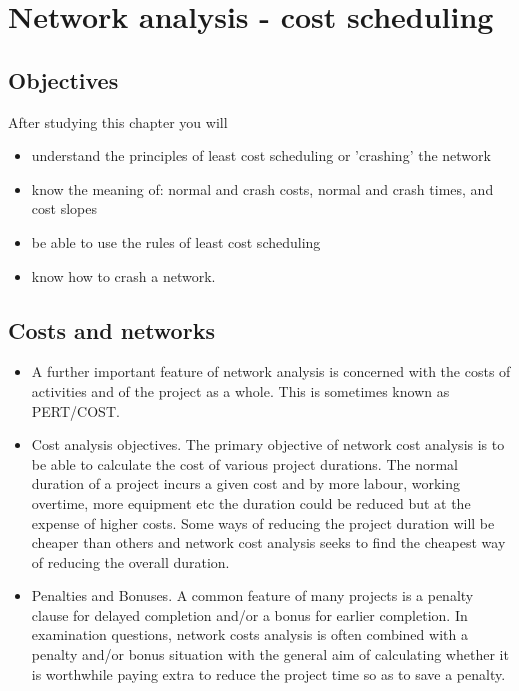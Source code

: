 \section{Network analysis - cost scheduling}
\subsection{Objectives}
After studying this chapter you will 
\begin{itemize}
\item  understand the principles of least cost scheduling or 'crashing' the network 
\item  know the meaning of: normal and crash costs, normal and crash times, and cost slopes 
\item  be able to use the rules of least cost scheduling 
\item  know how to crash a network. 
\end{itemize}
\subsection{Costs and networks}
\begin{itemize}
\item A further important feature of network analysis is concerned with the costs of activities 
and of the project as a whole. This is sometimes known as PERT/COST. 
\item Cost analysis objectives. The primary objective of network cost analysis is to be able to 
calculate the cost of various project durations. The normal duration of a project incurs a 
given cost and by more labour, working overtime, more equipment etc the duration 
could be reduced but at the expense of higher costs. Some ways of reducing the project 
duration will be cheaper than others and network cost analysis seeks to find the cheapest 
way of reducing the overall duration. 
\item Penalties and Bonuses. A common feature of many projects is a penalty clause for 
delayed completion and/or a bonus for earlier completion. In examination questions, 
network costs analysis is often combined with a penalty and/or bonus situation with the 
general aim of calculating whether it is worthwhile paying extra to reduce the project 
time so as to save a penalty. 
\end{itemize}
